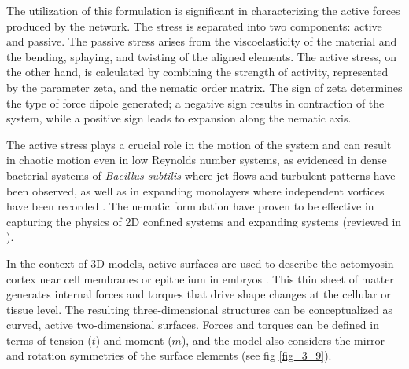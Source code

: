 The utilization of this formulation is significant in characterizing the active forces produced by the network. The stress is separated into two components: active and passive. The passive stress arises from the viscoelasticity of the material and the bending, splaying, and twisting of the aligned elements. The active stress, on the other hand, is calculated by combining the strength of activity, represented by the parameter zeta, and the nematic order matrix. The sign of zeta determines the type of force dipole generated; a negative sign results in contraction of the system, while a positive sign leads to expansion along the nematic axis.

The active stress plays a crucial role in the motion of the system and can result in chaotic motion even in low Reynolds number systems, as evidenced in dense bacterial systems of \textit{Bacillus subtilis} where jet flows and turbulent patterns have been observed, as well as in expanding monolayers where independent vortices have been recorded \cite{wensink2012, blanch-mercader2018}. The nematic formulation have proven to be effective in capturing the physics of 2D confined systems and expanding systems (reviewed in \cite{saw2018}).

In the context of 3D models, active surfaces are used to describe the actomyosin cortex near cell membranes or epithelium in embryos \cite{salbreux2017}. This thin sheet of matter generates internal forces and torques that drive shape changes at the cellular or tissue level. The resulting three-dimensional structures can be conceptualized as curved, active two-dimensional surfaces. Forces and torques can be defined in terms of tension (\(t\)) and moment (\(m\)), and the model also considers the mirror and rotation symmetries of the surface elements (see fig \ref{fig_3_9}).
%
%

